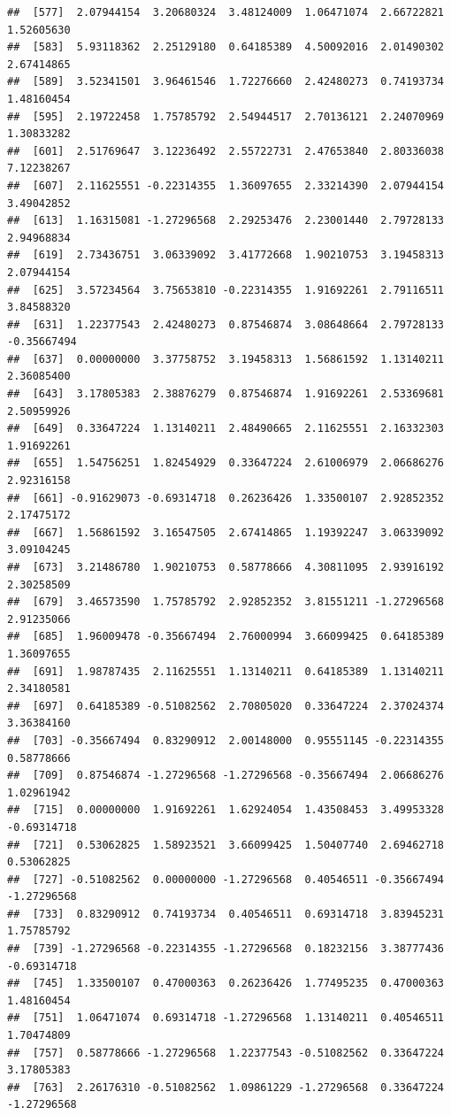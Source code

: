 \documentclass[
]{article}
\begin{document}
\begin{verbatim}
##  [577]  2.07944154  3.20680324  3.48124009  1.06471074  2.66722821  1.52605630
##  [583]  5.93118362  2.25129180  0.64185389  4.50092016  2.01490302  2.67414865
##  [589]  3.52341501  3.96461546  1.72276660  2.42480273  0.74193734  1.48160454
##  [595]  2.19722458  1.75785792  2.54944517  2.70136121  2.24070969  1.30833282
##  [601]  2.51769647  3.12236492  2.55722731  2.47653840  2.80336038  7.12238267
##  [607]  2.11625551 -0.22314355  1.36097655  2.33214390  2.07944154  3.49042852
##  [613]  1.16315081 -1.27296568  2.29253476  2.23001440  2.79728133  2.94968834
##  [619]  2.73436751  3.06339092  3.41772668  1.90210753  3.19458313  2.07944154
##  [625]  3.57234564  3.75653810 -0.22314355  1.91692261  2.79116511  3.84588320
##  [631]  1.22377543  2.42480273  0.87546874  3.08648664  2.79728133 -0.35667494
##  [637]  0.00000000  3.37758752  3.19458313  1.56861592  1.13140211  2.36085400
##  [643]  3.17805383  2.38876279  0.87546874  1.91692261  2.53369681  2.50959926
##  [649]  0.33647224  1.13140211  2.48490665  2.11625551  2.16332303  1.91692261
##  [655]  1.54756251  1.82454929  0.33647224  2.61006979  2.06686276  2.92316158
##  [661] -0.91629073 -0.69314718  0.26236426  1.33500107  2.92852352  2.17475172
##  [667]  1.56861592  3.16547505  2.67414865  1.19392247  3.06339092  3.09104245
##  [673]  3.21486780  1.90210753  0.58778666  4.30811095  2.93916192  2.30258509
##  [679]  3.46573590  1.75785792  2.92852352  3.81551211 -1.27296568  2.91235066
##  [685]  1.96009478 -0.35667494  2.76000994  3.66099425  0.64185389  1.36097655
##  [691]  1.98787435  2.11625551  1.13140211  0.64185389  1.13140211  2.34180581
##  [697]  0.64185389 -0.51082562  2.70805020  0.33647224  2.37024374  3.36384160
##  [703] -0.35667494  0.83290912  2.00148000  0.95551145 -0.22314355  0.58778666
##  [709]  0.87546874 -1.27296568 -1.27296568 -0.35667494  2.06686276  1.02961942
##  [715]  0.00000000  1.91692261  1.62924054  1.43508453  3.49953328 -0.69314718
##  [721]  0.53062825  1.58923521  3.66099425  1.50407740  2.69462718  0.53062825
##  [727] -0.51082562  0.00000000 -1.27296568  0.40546511 -0.35667494 -1.27296568
##  [733]  0.83290912  0.74193734  0.40546511  0.69314718  3.83945231  1.75785792
##  [739] -1.27296568 -0.22314355 -1.27296568  0.18232156  3.38777436 -0.69314718
##  [745]  1.33500107  0.47000363  0.26236426  1.77495235  0.47000363  1.48160454
##  [751]  1.06471074  0.69314718 -1.27296568  1.13140211  0.40546511  1.70474809
##  [757]  0.58778666 -1.27296568  1.22377543 -0.51082562  0.33647224  3.17805383
##  [763]  2.26176310 -0.51082562  1.09861229 -1.27296568  0.33647224 -1.27296568

\end{verbatim}
\end{document}
